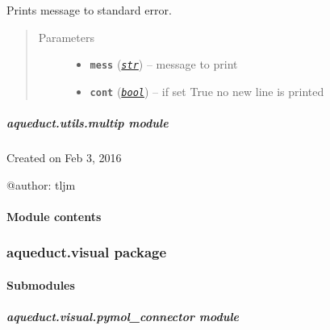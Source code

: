 \documentclass[a4paper,10pt,english]{sphinxmanual}
\begin{document}
\begin{fulllineitems}
\label{aqueduct.utils.log:aqueduct.utils.log.message}
Prints message to standard error.
\begin{quote}\begin{description}
\item[{Parameters}] \leavevmode\begin{itemize}
\item {} 
\textbf{\texttt{mess}} (\href{http://docs.python.org/2/library/functions.html\#str}{\emph{\texttt{str}}}) -- message to print

\item {} 
\textbf{\texttt{cont}} (\href{http://docs.python.org/2/library/functions.html\#bool}{\emph{\texttt{bool}}}) -- if set True no new line is printed

\end{itemize}

\end{description}\end{quote}

\end{fulllineitems}



\subparagraph{aqueduct.utils.multip module}
\label{aqueduct.utils.multip:module-aqueduct.utils.multip}\label{aqueduct.utils.multip::doc}\label{aqueduct.utils.multip:aqueduct-utils-multip-module}
Created on Feb 3, 2016

@author: tljm


\paragraph{Module contents}
\label{aqueduct.utils:module-aqueduct.utils}\label{aqueduct.utils:module-contents}

\subsubsection{aqueduct.visual package}
\label{aqueduct.visual:aqueduct-visual-package}\label{aqueduct.visual::doc}

\paragraph{Submodules}
\label{aqueduct.visual:submodules}

\subparagraph{aqueduct.visual.pymol\_connector module}
\label{aqueduct.visual.pymol_connector:module-aqueduct.visual.pymol_connector}\label{aqueduct.visual.pymol_connector::doc}\label{aqueduct.visual.pymol_connector:aqueduct-visual-pymol-connector-module}
\end{document}
